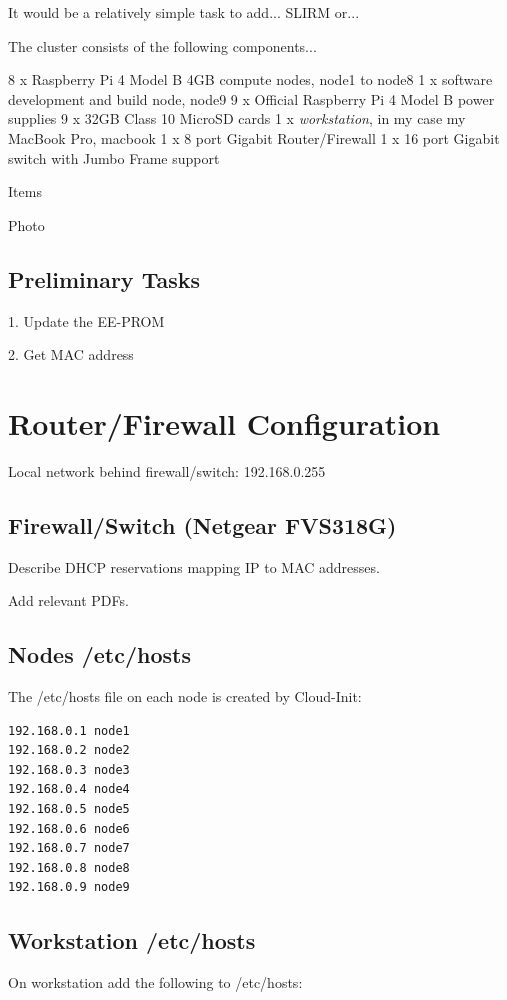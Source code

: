 \documentclass{article}
\begin{document}
It would be a relatively simple task to add... SLIRM or...

The cluster consists of the following components...

8 x Raspberry Pi 4 Model B 4GB compute nodes, node1 to node8
1 x software development and build node, node9
9 x Official Raspberry Pi 4 Model B power supplies
9 x 32GB Class 10 MicroSD cards
1 x \emph{workstation}, in my case my MacBook Pro, macbook
1 x 8 port Gigabit Router/Firewall
1 x 16 port Gigabit switch with Jumbo Frame support

Items

Photo


\subsection{Preliminary Tasks}

1. Update the EE-PROM

2. Get MAC address


%
%
\section{Router/Firewall Configuration}

Local network behind firewall/switch: 192.168.0.255

\subsection{Firewall/Switch (Netgear FVS318G)}
Describe DHCP reservations mapping IP to MAC addresses.

Add relevant PDFs.

\subsection{Nodes /etc/hosts}
The /etc/hosts file on each node is created by Cloud-Init:

\begin{verbatim}
192.168.0.1 node1
192.168.0.2 node2
192.168.0.3 node3
192.168.0.4 node4
192.168.0.5 node5
192.168.0.6 node6
192.168.0.7 node7
192.168.0.8 node8
192.168.0.9 node9
\end{verbatim}

\subsection{Workstation /etc/hosts}
On workstation add the following to /etc/hosts:
\end{document}
